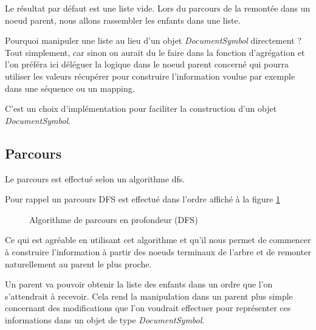 \documentclass[
    iict, %
    il, %
]{heig-tb}
\begin{document}
Le résultat par défaut est une liste vide. Lors du parcours de la remontée dans un noeud parent, nous allons rassembler les enfants dans une liste.

Pourquoi manipuler une liste au lieu d'un objet \emph{DocumentSymbol} directement ?
Tout simplement, car sinon on aurait du le faire dans la fonction d'agrégation et l'on préféra ici déléguer la logique dans le noeud parent concerné
qui pourra utiliser les valeurs récupérer pour construire l'information voulue par exemple dans une séquence ou un mapping.

C'est un choix d'implémentation pour faciliter la construction d'un objet \emph{DocumentSymbol}.

\subsection{Parcours}

Le parcours est effectué selon un algorithme \Gls{dfs}.

Pour rappel un parcours DFS est effectué dans l'ordre affiché à la figure \ref*{Algorithme de parcours en profondeur (DFS)}

\begin{figure}[!h]
    \begin{center}
    \end{center}
    \caption[Algorithme de parcours en profondeur (DFS)]{\label{Algorithme de parcours en profondeur (DFS)} Algorithme de parcours en profondeur (DFS)}
\end{figure}

Ce qui est agréable en utilisant cet algorithme et qu'il nous permet de commencer à construire l'information à partir des noeuds terminaux
de l'arbre et de remonter naturellement au parent le plus proche.

Un parent va pouvoir obtenir la liste des enfants dans un ordre que l'on s'attendrait à recevoir.
Cela rend la manipulation dans un parent plus simple concernant des modifications que l'on voudrait effectuer pour représenter ces informations
dans un objet de type \emph{DocumentSymbol}.
\end{document}
